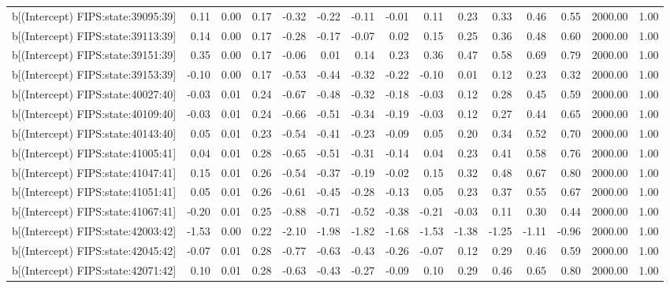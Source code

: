 \begin{table}[ht]
\begin{tabular}{rrrrrrrrrrrrrrr}
  b[(Intercept) FIPS:state:39095:39] & 0.11 & 0.00 & 0.17 & -0.32 & -0.22 & -0.11 & -0.01 & 0.11 & 0.23 & 0.33 & 0.46 & 0.55 & 2000.00 & 1.00 \\ 
  b[(Intercept) FIPS:state:39113:39] & 0.14 & 0.00 & 0.17 & -0.28 & -0.17 & -0.07 & 0.02 & 0.15 & 0.25 & 0.36 & 0.48 & 0.60 & 2000.00 & 1.00 \\ 
  b[(Intercept) FIPS:state:39151:39] & 0.35 & 0.00 & 0.17 & -0.06 & 0.01 & 0.14 & 0.23 & 0.36 & 0.47 & 0.58 & 0.69 & 0.79 & 2000.00 & 1.00 \\ 
  b[(Intercept) FIPS:state:39153:39] & -0.10 & 0.00 & 0.17 & -0.53 & -0.44 & -0.32 & -0.22 & -0.10 & 0.01 & 0.12 & 0.23 & 0.32 & 2000.00 & 1.00 \\ 
  b[(Intercept) FIPS:state:40027:40] & -0.03 & 0.01 & 0.24 & -0.67 & -0.48 & -0.32 & -0.18 & -0.03 & 0.12 & 0.28 & 0.45 & 0.59 & 2000.00 & 1.00 \\ 
  b[(Intercept) FIPS:state:40109:40] & -0.03 & 0.01 & 0.24 & -0.66 & -0.51 & -0.34 & -0.19 & -0.03 & 0.12 & 0.27 & 0.44 & 0.65 & 2000.00 & 1.00 \\ 
  b[(Intercept) FIPS:state:40143:40] & 0.05 & 0.01 & 0.23 & -0.54 & -0.41 & -0.23 & -0.09 & 0.05 & 0.20 & 0.34 & 0.52 & 0.70 & 2000.00 & 1.00 \\ 
  b[(Intercept) FIPS:state:41005:41] & 0.04 & 0.01 & 0.28 & -0.65 & -0.51 & -0.31 & -0.14 & 0.04 & 0.23 & 0.41 & 0.58 & 0.76 & 2000.00 & 1.00 \\ 
  b[(Intercept) FIPS:state:41047:41] & 0.15 & 0.01 & 0.26 & -0.54 & -0.37 & -0.19 & -0.02 & 0.15 & 0.32 & 0.48 & 0.67 & 0.80 & 2000.00 & 1.00 \\ 
  b[(Intercept) FIPS:state:41051:41] & 0.05 & 0.01 & 0.26 & -0.61 & -0.45 & -0.28 & -0.13 & 0.05 & 0.23 & 0.37 & 0.55 & 0.67 & 2000.00 & 1.00 \\ 
  b[(Intercept) FIPS:state:41067:41] & -0.20 & 0.01 & 0.25 & -0.88 & -0.71 & -0.52 & -0.38 & -0.21 & -0.03 & 0.11 & 0.30 & 0.44 & 2000.00 & 1.00 \\ 
  b[(Intercept) FIPS:state:42003:42] & -1.53 & 0.00 & 0.22 & -2.10 & -1.98 & -1.82 & -1.68 & -1.53 & -1.38 & -1.25 & -1.11 & -0.96 & 2000.00 & 1.00 \\ 
  b[(Intercept) FIPS:state:42045:42] & -0.07 & 0.01 & 0.28 & -0.77 & -0.63 & -0.43 & -0.26 & -0.07 & 0.12 & 0.29 & 0.46 & 0.59 & 2000.00 & 1.00 \\ 
  b[(Intercept) FIPS:state:42071:42] & 0.10 & 0.01 & 0.28 & -0.63 & -0.43 & -0.27 & -0.09 & 0.10 & 0.29 & 0.46 & 0.65 & 0.80 & 2000.00 & 1.00 \\ 

\end{tabular}
\end{table}
